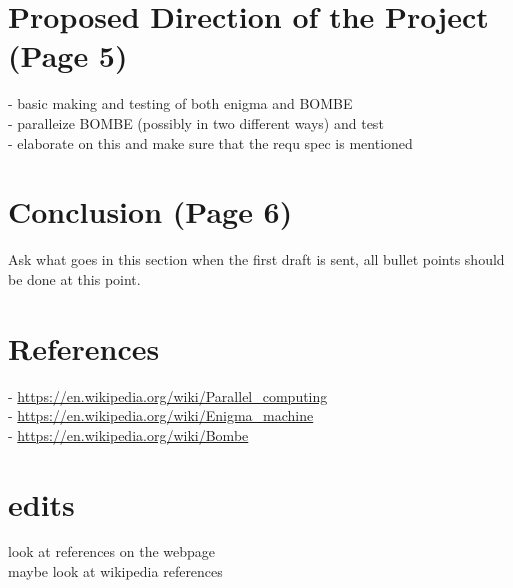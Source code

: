 \documentclass[a4paper, 11pt]{article}
\begin{document}
\section*{Proposed Direction of the Project (Page 5)}

- basic making and testing of both enigma and BOMBE\\
- paralleize BOMBE (possibly in two different ways) and test\\
- elaborate on this and make sure that the requ spec is mentioned\\

\section*{Conclusion (Page 6)}

Ask what goes in this section when the first draft is sent, all bullet points should be done at this point.\\

\section*{References}

- {\url{https://en.wikipedia.org/wiki/Parallel_computing}}\\
- {\url{https://en.wikipedia.org/wiki/Enigma_machine}}\\
- {\url{https://en.wikipedia.org/wiki/Bombe}}\\

\section*{edits}

look at references on the webpage\\
maybe look at wikipedia references\\
\end{document}
